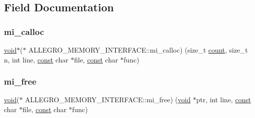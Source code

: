 \subsection{Field Documentation}
\mbox{\label{struct_a_l_l_e_g_r_o___m_e_m_o_r_y___i_n_t_e_r_f_a_c_e_aac824232a661735f00411186867422f2}} 
\subsubsection{\texorpdfstring{mi\+\_\+calloc}{mi\_calloc}}
{\footnotesize\ttfamily \hyperlink{png_8h_ac9c84fa68bbad002983e35ce3663c686}{void}$\ast$($\ast$ A\+L\+L\+E\+G\+R\+O\+\_\+\+M\+E\+M\+O\+R\+Y\+\_\+\+I\+N\+T\+E\+R\+F\+A\+C\+E\+::mi\+\_\+calloc) (size\+\_\+t \hyperlink{_core_8c_ad43c3812e6d13e0518d9f8b8f463ffcf}{count}, size\+\_\+t n, int line, \hyperlink{zconf_8h_a2c212835823e3c54a8ab6d95c652660e}{const} char $\ast$file, \hyperlink{zconf_8h_a2c212835823e3c54a8ab6d95c652660e}{const} char $\ast$func)}

\mbox{\label{struct_a_l_l_e_g_r_o___m_e_m_o_r_y___i_n_t_e_r_f_a_c_e_a4fc0ccc54ec59996adc3c2b45512c4b9}} 
\subsubsection{\texorpdfstring{mi\+\_\+free}{mi\_free}}
{\footnotesize\ttfamily \hyperlink{png_8h_ac9c84fa68bbad002983e35ce3663c686}{void}($\ast$ A\+L\+L\+E\+G\+R\+O\+\_\+\+M\+E\+M\+O\+R\+Y\+\_\+\+I\+N\+T\+E\+R\+F\+A\+C\+E\+::mi\+\_\+free) (\hyperlink{png_8h_ac9c84fa68bbad002983e35ce3663c686}{void} $\ast$ptr, int line, \hyperlink{zconf_8h_a2c212835823e3c54a8ab6d95c652660e}{const} char $\ast$file, \hyperlink{zconf_8h_a2c212835823e3c54a8ab6d95c652660e}{const} char $\ast$func)}

